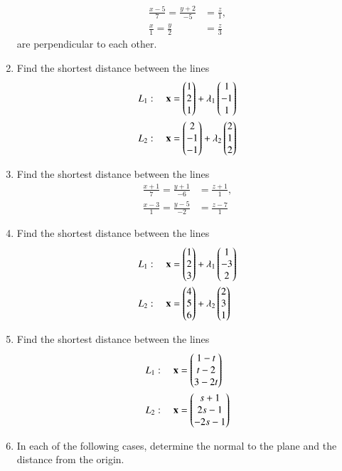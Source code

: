 \begin{enumerate}[label=\arabic*.,ref=\thesubsection.\theenumi]
\begin{align}
\frac{x-5}{7} = \frac{y+2}{-5} &= \frac{z}{1}, 
\\
\frac{x}{1} = \frac{y}{2} &= \frac{z}{3} 
\end{align}
%
are perpendicular to each other.
\item Find the shortest distance between the lines 
\begin{align}
L_1: \quad \mathbf{x} &= \begin{pmatrix}1\\2\\1\end{pmatrix} + \lambda_1\begin{pmatrix}1 \\ -1 \\1\end{pmatrix}
\\
L_2: \quad \mathbf{x} &= \begin{pmatrix}2\\-1\\-1\end{pmatrix} + \lambda_2\begin{pmatrix}2 \\ 1 \\2\end{pmatrix}
\end{align}
\item Find the shortest distance between the lines 
\begin{align}
\frac{x+1}{7} = \frac{y+1}{-6} &= \frac{z+1}{1}, 
\\
\frac{x-3}{1} = \frac{y-5}{-2} &= \frac{z-7}{1} 
\end{align}
%
\item Find the shortest distance between the lines 
\begin{align}
L_1: \quad \mathbf{x} &= \begin{pmatrix}1\\2\\3\end{pmatrix} + \lambda_1\begin{pmatrix}1 \\ -3 \\2\end{pmatrix}
\\
L_2: \quad \mathbf{x} &= \begin{pmatrix}4\\5\\6\end{pmatrix} + \lambda_2\begin{pmatrix}2 \\ 3 \\1\end{pmatrix}
\end{align}
%
\item Find the shortest distance between the lines 
\begin{align}
L_1: \quad \mathbf{x} &= \begin{pmatrix}1-t\\t-2\\3-2t\end{pmatrix} 
\\
L_2: \quad \mathbf{x} &= \begin{pmatrix}s+1\\2s-1\\-2s-1\end{pmatrix}
\end{align}
\item In each of the following cases, determine the normal to the plane and the distance from the origin.

\end{enumerate}
